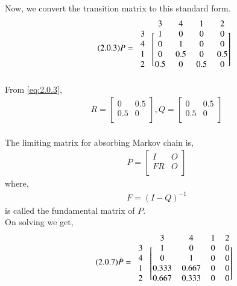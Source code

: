 \documentclass[journal,12pt,twocolumn]{IEEEtran}
\begin{document}
\\Now, we convert the transition matrix to this standard form.
\begin{align}
\tag{2.0.3}
\label{eq:2.0.3}
    P = \begin{blockarray}{ccccc}
    &3 &4 &1 &2\\
    \begin{block}{c[cccc]}
    3 & 1 & 0 & 0 & 0 \\
    4 & 0 & 1 & 0 & 0 \\
    1 & 0 & 0.5 & 0 & 0.5 \\
    2 & 0.5 & 0 & 0.5 & 0 \\
    \end{block}
    \end{blockarray}
\end{align}
From \eqref{eq:2.0.3}, 
\begin{align}
    \tag{2.0.4}
    \label{eq:2.0.4}
    R = \begin{bmatrix}
    0 & 0.5\\
    0.5 & 0\\
    \end{bmatrix}
    , Q = \begin{bmatrix}
    0 & 0.5\\
    0.5 & 0\\
    \end{bmatrix}
\end{align}
\\The limiting matrix for absorbing Markov chain is,
\begin{align}
\tag{2.0.5}
\label{eq:2.0.5}
    \bar P=\begin{bmatrix}
    I & O\\
    FR & O\\
    \end{bmatrix}
\end{align}
where,
\begin{align}
\tag{2.0.6}
\label{eq:2.0.6}
    F=(I-Q)^{-1}
\end{align}
is called the fundamental matrix of $P$. \\
On solving we get,
\begin{align}
    \tag{2.0.7}
    \label{eq:2.0.7}
    \bar P = \begin{blockarray}{ccccc}
    &3 &4 &1 &2\\
    \begin{block}{c[cccc]}
    3 & 1 & 0 & 0 & 0\\
    4 & 0 & 1 & 0 & 0\\
    1 & 0.333 & 0.667 & 0 & 0\\
    2 & 0.667 & 0.333 & 0 & 0\\
    \end{block}
    \end{blockarray}
\end{align}
\end{document}
